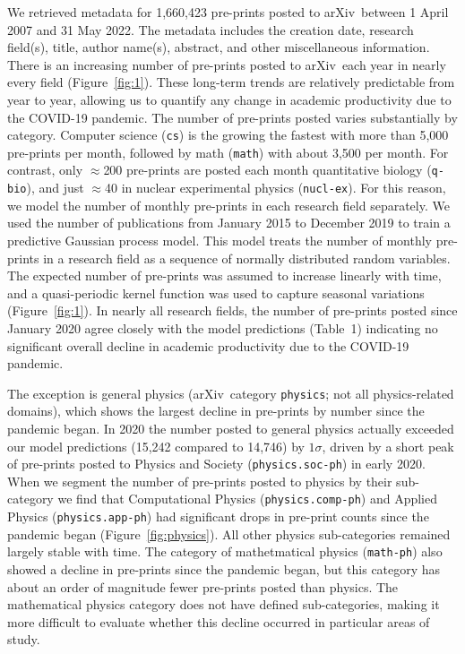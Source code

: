 \documentclass[]{rsos}%
\newcommand{\arxiv}{arXiv}
\begin{document}
We retrieved metadata for 1,660,423 pre-prints posted to \arxiv\ between 1 April 2007 and 31 May 2022. The metadata includes the creation date, research field(s), title, author name(s), abstract, and other miscellaneous information\cite{Clement:2019}. There is an increasing number of pre-prints posted to \arxiv\ each year in nearly every field (Figure~\ref{fig:1}). These long-term trends are relatively predictable from year to year, allowing us to quantify any change in academic productivity due to the COVID-19 pandemic. The number of pre-prints posted varies substantially by category. Computer science (\texttt{cs}) is the growing the fastest with more than 5,000 pre-prints per month, followed by math (\texttt{math}) with about 3,500 per month. For contrast, only $\approx$200 pre-prints are posted each month quantitative biology (\texttt{q-bio}), and just $\approx$40 in nuclear experimental physics (\texttt{nucl-ex}). For this reason, we model the number of monthly pre-prints in each research field separately. We used the number of publications from January 2015 to December 2019 to train a predictive Gaussian process model\cite{Rasmussen:2006}. This model treats the number of monthly pre-prints in a research field as a sequence of normally distributed random variables. The expected number of pre-prints was assumed to increase linearly with time, and a quasi-periodic kernel function\cite{Rasmussen:2006,Ambikasaran:2014} was used to capture seasonal variations (Figure~\ref{fig:1}). In nearly all research fields, the number of pre-prints posted since January 2020 agree closely with the model predictions (Table~1) indicating no significant overall decline in academic productivity due to the COVID-19 pandemic. %

The exception is general physics (\arxiv\ category \texttt{physics}; not all physics-related domains), which shows the largest decline in pre-prints by number since the pandemic began. In 2020 the number posted to general physics actually exceeded our model predictions (15,242 compared to 14,746) by $1\sigma$, driven by a short peak of pre-prints posted to Physics and Society (\texttt{physics.soc-ph}) in early 2020. When we segment the number of pre-prints posted to physics by their sub-category we find that Computational Physics (\texttt{physics.comp-ph}) and Applied Physics (\texttt{physics.app-ph}) had significant drops in pre-print counts since the pandemic began (Figure~\ref{fig:physics}). All other physics sub-categories remained largely stable with time. The category of mathetmatical physics (\texttt{math-ph}) also showed a decline in pre-prints since the pandemic began, but this category has about an order of magnitude fewer pre-prints posted than physics. The mathematical physics category does not have defined sub-categories, making it more difficult to evaluate whether this decline occurred in particular areas of study.
\end{document}
